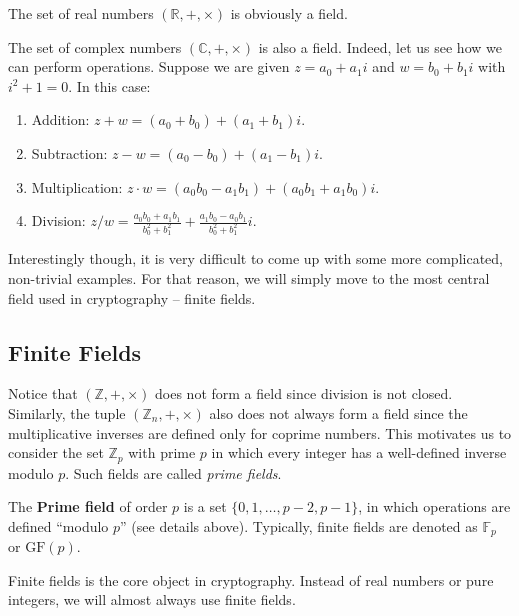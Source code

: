 \documentclass[../lecture-notes-148x210.tex]{subfiles}
\begin{document}
\begin{example}
    The set of real numbers $(\mathbb{R}, +, \times)$ is obviously a field.
\end{example}

\begin{example}
    The set of complex numbers $(\mathbb{C}, +, \times)$ is also a field. Indeed, let us see how we can perform 
    operations. Suppose we are given $z = a_0 + a_1i$ and $w = b_0 + b_1i$ with $i^2+1=0$. In this case:
    \begin{enumerate}
        \item Addition: $z + w = (a_0 + b_0) + (a_1 + b_1)i$.
        \item Subtraction: $z - w = (a_0 - b_0) + (a_1 - b_1)i$.
        \item Multiplication: $z \cdot w = (a_0b_0 - a_1b_1) + (a_0b_1 + a_1b_0)i$.
        \item Division: $z / w = \frac{a_0b_0 + a_1b_1}{b_0^2 + b_1^2} + \frac{a_1b_0 - a_0b_1}{b_0^2 + b_1^2}i$.
    \end{enumerate}
\end{example}

Interestingly though, it is very difficult to come up with some more complicated, non-trivial examples. For that 
reason, we will simply move to the most central field used in cryptography -- finite fields.

\subsection{Finite Fields}
Notice that $(\mathbb{Z},+,\times)$ does not form a field since division is not
closed. Similarly, the tuple $(\mathbb{Z}_n,+,\times)$ also does not always form
a field since the multiplicative inverses are defined only for coprime numbers.
This motivates us to consider the set $\mathbb{Z}_p$ with prime $p$ in which
every integer has a well-defined inverse modulo $p$. Such fields are called
\textit{prime fields}. 

\begin{definition}
    The \textbf{Prime field} of order $p$ is a set $\{0,1,\dots,p-2,p-1\}$, in
    which operations are defined ``modulo $p$'' (see details above). Typically,
    finite fields are denoted as $\mathbb{F}_p$ or $\text{GF}(p)$.
\end{definition}

Finite fields is the core object in cryptography. Instead of real numbers or pure integers, we will almost always 
use finite fields.
\end{document}
